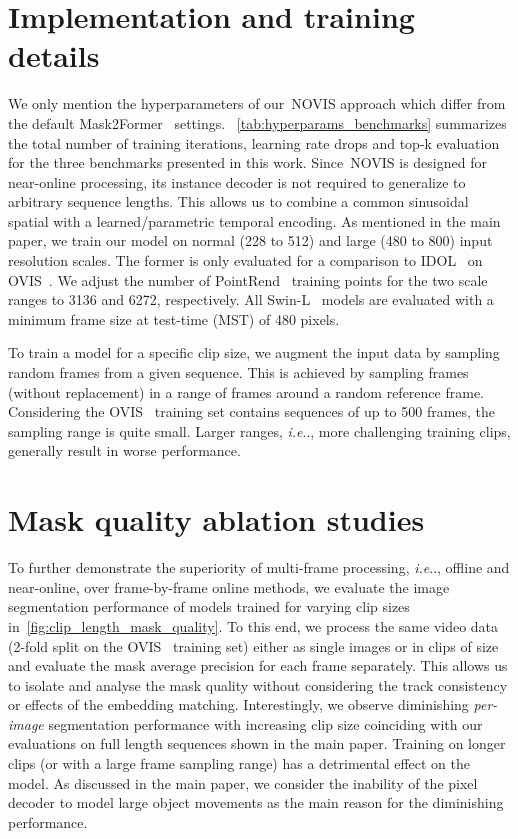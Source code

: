 \documentclass{article}
\makeatletter
\newcommand{\method}{\mbox{NOVIS}}
\theoremstyle{plain}
\theoremstyle{definition}
\theoremstyle{remark}
\DeclareRobustCommand\onedot{\futurelet\@let@token\@onedot}
\def\@onedot{\ifx\@let@token.\else.\null\fi\xspace}
\def\ie{\emph{i.e}\onedot} \def\Ie{\emph{I.e}\onedot}
\makeatother
\begin{document}
\section{Implementation and training details}
We only mention the hyperparameters of our~\method{} approach which differ from the default Mask2Former~\cite{cheng2021mask2former} settings.
~\cref{tab:hyperparams_benchmarks} summarizes the total number of training iterations, learning rate drops and top-k evaluation for the three benchmarks presented in this work.
Since~\method{} is designed for near-online processing, its instance decoder is not required to generalize to arbitrary sequence lengths.
This allows us to combine a common sinusoidal spatial with a learned/parametric temporal encoding.
As mentioned in the main paper, we train our model on normal (228 to 512) and large (480 to 800) input resolution scales.
The former is only evaluated for a comparison to IDOL~\cite{IDOL} on OVIS~\cite{ovis}.
We adjust the number of PointRend~\cite{kirillov2019pointrend} training points for the two scale ranges to 3136 and 6272, respectively.
All Swin-L~\cite{SwinTransformer} models are evaluated with a minimum frame size at test-time (MST) of 480 pixels.
 
To train a model for a specific clip size, we augment the input data by sampling  random frames from a given sequence.
This is achieved by sampling  frames (without replacement) in a range of  frames around a random reference frame.
Considering the OVIS~\cite{ovis} training set contains sequences of up to 500 frames, the sampling range is quite small.
Larger ranges, \ie, more challenging training clips, generally result in worse performance.

\section{Mask quality ablation studies}

To further demonstrate the superiority of multi-frame processing, \ie, offline and near-online, over frame-by-frame online methods, we evaluate the image segmentation performance of models trained for varying clip sizes in~\cref{fig:clip_length_mask_quality}.
To this end, we process the same video data (2-fold split on the OVIS~\cite{ovis} training set) either as single images or in clips of size  and evaluate the mask average precision for each frame separately.
This allows us to isolate and analyse the mask quality without considering the track consistency or effects of the embedding matching.
Interestingly, we observe diminishing \emph{per-image} segmentation performance with increasing clip size coinciding with our evaluations on full length sequences shown in the main paper.
Training on longer clips (or with a large frame sampling range) has a detrimental effect on the model.
As discussed in the main paper, we consider the inability of the pixel decoder to model large object movements as the main reason for the diminishing performance.
\end{document}
